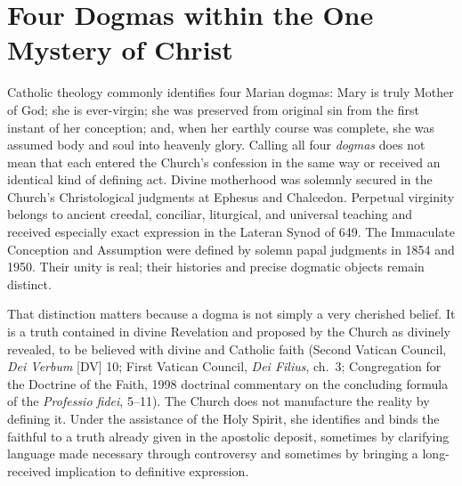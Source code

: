 \section{Four Dogmas within the One Mystery of Christ}


Catholic theology commonly identifies four Marian dogmas: Mary is truly Mother of God; she is ever-virgin; she was preserved from original sin from the first instant of her conception; and, when her earthly course was complete, she was assumed body and soul into heavenly glory. Calling all four \emph{dogmas} does not mean that each entered the Church's confession in the same way or received an identical kind of defining act. Divine motherhood was solemnly secured in the Church's Christological judgments at Ephesus and Chalcedon. Perpetual virginity belongs to ancient creedal, conciliar, liturgical, and universal teaching and received especially exact expression in the Lateran Synod of 649. The Immaculate Conception and Assumption were defined by solemn papal judgments in 1854 and 1950. Their unity is real; their histories and precise dogmatic objects remain distinct.

That distinction matters because a dogma is not simply a very cherished belief. It is a truth contained in divine Revelation and proposed by the Church as divinely revealed, to be believed with divine and Catholic faith (Second Vatican Council, \emph{Dei Verbum} [DV] 10; First Vatican Council, \emph{Dei Filius}, ch.~3; Congregation for the Doctrine of the Faith, 1998 doctrinal commentary on the concluding formula of the \emph{Professio fidei}, 5--11). The Church does not manufacture the reality by defining it. Under the assistance of the Holy Spirit, she identifies and binds the faithful to a truth already given in the apostolic deposit, sometimes by clarifying language made necessary through controversy and sometimes by bringing a long-received implication to definitive expression.

